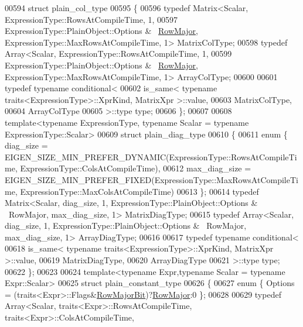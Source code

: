 \begin{DoxyCode}
{00594 \textcolor{keyword}{struct }plain\_col\_type
00595 \{
00596   \textcolor{keyword}{typedef} Matrix<Scalar, ExpressionType::RowsAtCompileTime, 1,
00597                  ExpressionType::PlainObject::Options & ~\hyperlink{group__enums_ggaacded1a18ae58b0f554751f6cdf9eb13acfcde9cd8677c5f7caf6bd603666aae3}{RowMajor}, 
      ExpressionType::MaxRowsAtCompileTime, 1> MatrixColType;
00598   \textcolor{keyword}{typedef} Array<Scalar, ExpressionType::RowsAtCompileTime, 1,
00599                  ExpressionType::PlainObject::Options & ~\hyperlink{group__enums_ggaacded1a18ae58b0f554751f6cdf9eb13acfcde9cd8677c5f7caf6bd603666aae3}{RowMajor}, 
      ExpressionType::MaxRowsAtCompileTime, 1> ArrayColType;
00600 
00601   \textcolor{keyword}{typedef} \textcolor{keyword}{typename} conditional<
00602     is\_same< typename traits<ExpressionType>::XprKind, MatrixXpr >::value,
00603     MatrixColType,
00604     ArrayColType 
00605   >::type type;
00606 \};
00607 
00608 \textcolor{keyword}{template}<\textcolor{keyword}{typename} ExpressionType, \textcolor{keyword}{typename} Scalar = \textcolor{keyword}{typename} ExpressionType::Scalar>
00609 \textcolor{keyword}{struct }plain\_diag\_type
00610 \{
00611   \textcolor{keyword}{enum} \{ diag\_size = EIGEN\_SIZE\_MIN\_PREFER\_DYNAMIC(ExpressionType::RowsAtCompileTime, 
      ExpressionType::ColsAtCompileTime),
00612          max\_diag\_size = EIGEN\_SIZE\_MIN\_PREFER\_FIXED(ExpressionType::MaxRowsAtCompileTime, 
      ExpressionType::MaxColsAtCompileTime)
00613   \};
00614   \textcolor{keyword}{typedef} Matrix<Scalar, diag\_size, 1, ExpressionType::PlainObject::Options & ~RowMajor, max\_diag\_size, 1> 
      MatrixDiagType;
00615   \textcolor{keyword}{typedef} Array<Scalar, diag\_size, 1, ExpressionType::PlainObject::Options & ~RowMajor, max\_diag\_size, 1> 
      ArrayDiagType;
00616 
00617   \textcolor{keyword}{typedef} \textcolor{keyword}{typename} conditional<
00618     is\_same< typename traits<ExpressionType>::XprKind, MatrixXpr >::value,
00619     MatrixDiagType,
00620     ArrayDiagType 
00621   >::type type;
00622 \};
00623 
00624 \textcolor{keyword}{template}<\textcolor{keyword}{typename} Expr,\textcolor{keyword}{typename} Scalar = \textcolor{keyword}{typename} Expr::Scalar>
00625 \textcolor{keyword}{struct }plain\_constant\_type
00626 \{
00627   \textcolor{keyword}{enum} \{ Options = (traits<Expr>::Flags&\hyperlink{group__flags_gae4f56c2a60bbe4bd2e44c5b19cbe8762}{RowMajorBit})?\hyperlink{group__enums_ggaacded1a18ae58b0f554751f6cdf9eb13acfcde9cd8677c5f7caf6bd603666aae3}{RowMajor}:0 \};
00628 
00629   \textcolor{keyword}{typedef} Array<Scalar,  traits<Expr>::RowsAtCompileTime,   traits<Expr>::ColsAtCompileTime,
}
\end{DoxyCode}
